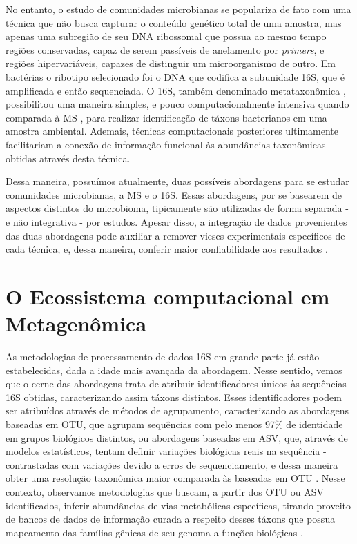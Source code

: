 \documentclass[
	12pt,				%
	oneside,			%
	a4paper,			%
	chapter=TITLE,		%
	section=TITLE,		%
	english,			%
	brazil				%
	]{abntex2}
\begin{document}
No entanto, o estudo de comunidades microbianas se populariza de fato com uma técnica que não busca capturar o conteúdo genético total de uma amostra, mas apenas uma subregião de seu \gls{DNA} ribossomal que possua ao mesmo tempo regiões conservadas, capaz de serem passíveis de anelamento por \emph{primers}, e regiões hipervariáveis, capazes de distinguir um microorganismo de outro. Em bactérias o ribotipo selecionado foi o \gls{DNA} que codifica a subunidade 16S, que é amplificada e então sequenciada. O \gls{16S}, também denominado metataxonômica \autocite{marchesi2015}, possibilitou uma maneira simples, e pouco computacionalmente intensiva quando comparada à \gls{MS} \autocite{tremblay2022}, para realizar identificação de táxons bacterianos em uma amostra ambiental. Ademais, técnicas computacionais posteriores ultimamente facilitariam a conexão de informação funcional às abundâncias taxonômicas obtidas através desta técnica.

Dessa maneira, possuímos atualmente, duas possíveis abordagens para se estudar comunidades microbianas, a \gls{MS} e o \gls{16S}. Essas abordagens, por se basearem de aspectos distintos do microbioma, tipicamente são utilizadas de forma separada - e não integrativa - por estudos. Apesar disso, a integração de dados provenientes das duas abordagens pode auxiliar a remover vieses experimentais específicos de cada técnica, e, dessa maneira, conferir maior confiabilidade aos resultados \autocite{yue2023}.

\section{O Ecossistema computacional em Metagenômica}\label{o-ecossistema-computacional-em-metagenuxf4mica}

As metodologias de processamento de dados \gls{16S} em grande parte já estão estabelecidas, dada a idade mais avançada da abordagem. Nesse sentido, vemos que o cerne das abordagens trata de atribuir identificadores únicos às sequências 16S obtidas, caracterizando assim táxons distintos. Esses identificadores podem ser atribuídos através de métodos de agrupamento, caracterizando as abordagens baseadas em \gls{OTU}, que agrupam sequências com pelo menos 97\% de identidade em grupos biológicos distintos, ou abordagens baseadas em \gls{ASV}, que, através de modelos estatísticos, tentam definir variações biológicas reais na sequência - contrastadas com variações devido a erros de sequenciamento, e dessa maneira obter uma resolução taxonômica maior comparada às baseadas em \gls{OTU} \autocite{chiarello2022}. Nesse contexto, observamos metodologias que buscam, a partir dos \gls{OTU} ou \gls{ASV} identificados, inferir abundâncias de vias metabólicas específicas, tirando proveito de bancos de dados de informação curada a respeito desses táxons que possua mapeamento das famílias gênicas de seu genoma a funções biológicas \autocite{douglas2020}.
\end{document}
